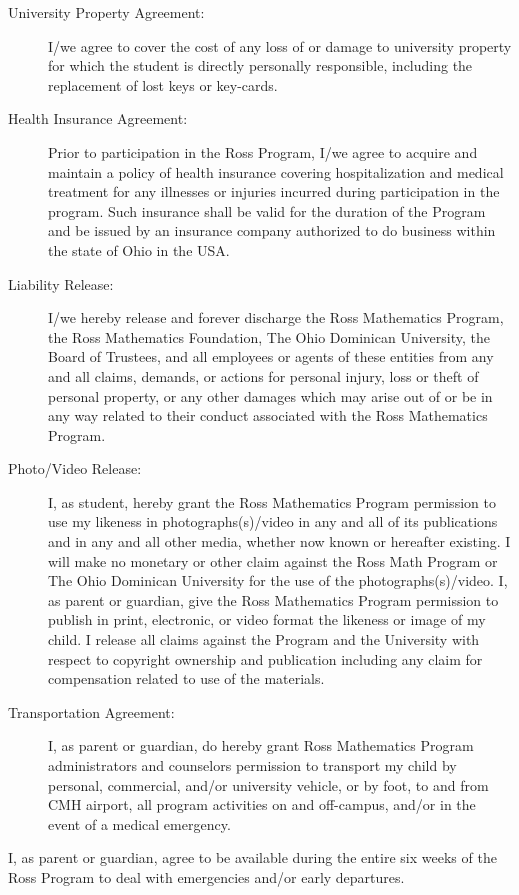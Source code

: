 \documentclass{ross}
\begin{document}
\begin{description}
\item[University Property Agreement:] I/we agree to cover the cost of
  any loss of or damage to university property for which the student
  is directly personally responsible, including the replacement of
  lost keys or key-cards.
\item[Health Insurance Agreement:] Prior to participation in the Ross
  Program, I/we agree to acquire and maintain a policy of health
  insurance covering hospitalization and medical treatment for any
  illnesses or injuries incurred during participation in the
  program. Such insurance shall be valid for the duration of the
  Program and be issued by an insurance company authorized to do
  business within the state of Ohio in the USA.                                           
\item[Liability Release:] I/we hereby release and forever discharge
  the Ross Mathematics Program, the Ross Mathematics Foundation, 
  The Ohio Dominican University, the Board  of Trustees, and 
  all employees or agents of these entities from any
  and all claims, demands, or actions for personal injury, loss or
  theft of personal property, or any other damages which may arise out
  of or be in any way related to their conduct associated with the
  Ross Mathematics Program.
\item[Photo/Video Release:] I, as student, hereby grant the Ross
  Mathematics Program permission to use my likeness in
  photographs(s)/video in any and all of its publications and in any
  and all other media, whether now known or hereafter existing. I will
  make no monetary or other claim against the Ross Math Program or The
  Ohio Dominican University for the use of the photographs(s)/video. I, as
  parent or guardian, give the Ross Mathematics Program permission to
  publish in print, electronic, or video format the likeness or image
  of my child. I release all claims against the Program and the
  University with respect to copyright ownership and publication
  including any claim for compensation related to use of the
  materials.
\item[Transportation Agreement:] I, as parent or guardian, do hereby
  grant Ross Mathematics Program administrators and counselors
  permission to transport my child by personal, commercial, and/or
  university vehicle, or by foot, to and from CMH airport, all program
  activities on and off-campus, and/or in the event of a medical
  emergency.
\end{description}
I, as parent or guardian, agree to be available during the entire six
weeks of the Ross Program to deal with emergencies and/or early
departures.
\end{document}
